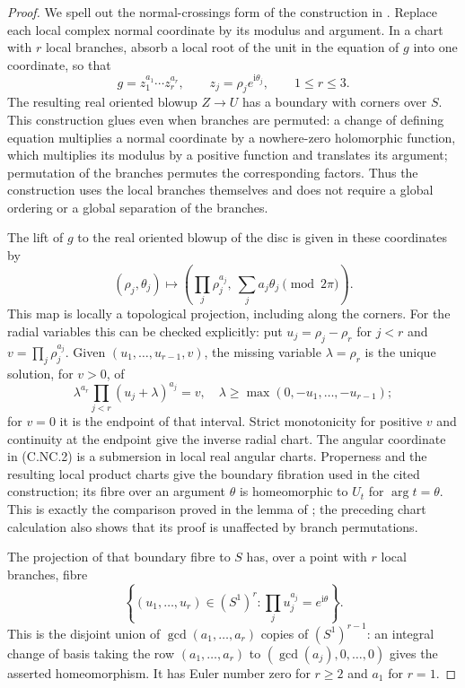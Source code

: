 \begin{proof}
We spell out the normal-crossings form of the construction in \cite[\S2.1--2.2, pp.~237--241]{ACampo1975}. Replace each local complex normal coordinate by its modulus and argument. In a chart with $r$ local branches, absorb a local root of the unit in the equation of $g$ into one coordinate, so that
\[
 g=z_1^{a_1}\cdots z_r^{a_r},\qquad
 z_j=\rho_j e^{\mathrm i\theta_j},\qquad 1\le r\le3.
\]
The resulting real oriented blowup $Z\to U$ has a boundary with corners over $S$. This construction glues even when branches are permuted: a change of defining equation multiplies a normal coordinate by a nowhere-zero holomorphic function, which multiplies its modulus by a positive function and translates its argument; permutation of the branches permutes the corresponding factors. Thus the construction uses the local branches themselves and does not require a global ordering or a global separation of the branches.

The lift of $g$ to the real oriented blowup of the disc is given in these coordinates by
\[
 (\rho_j,\theta_j)\longmapsto
 \left(\prod_j\rho_j^{a_j},\ \sum_j a_j\theta_j\pmod {2\pi}\right).
 \tag{C.NC.2}
\]
This map is locally a topological projection, including along the corners. For the radial variables this can be checked explicitly: put $u_j=\rho_j-\rho_r$ for $j<r$ and $v=\prod_j\rho_j^{a_j}$. Given $(u_1,\ldots,u_{r-1},v)$, the missing variable $\lambda=\rho_r$ is the unique solution, for $v>0$, of
\[
 \lambda^{a_r}\prod_{j<r}(u_j+\lambda)^{a_j}=v,
 \quad \lambda\ge\max(0,-u_1,\ldots,-u_{r-1});
\]
for $v=0$ it is the endpoint of that interval. Strict monotonicity for positive $v$ and continuity at the endpoint give the inverse radial chart. The angular coordinate in (C.NC.2) is a submersion in local real angular charts. Properness and the resulting local product charts give the boundary fibration used in the cited construction; its fibre over an argument $\theta$ is homeomorphic to $U_t$ for $\arg t=\theta$. This is exactly the comparison proved in the lemma of \cite[\S2.2]{ACampo1975}; the preceding chart calculation also shows that its proof is unaffected by branch permutations.

The projection of that boundary fibre to $S$ has, over a point with $r$ local branches, fibre
\[
 \left\{(u_1,\ldots,u_r)\in(S^1)^r:
             \prod_j u_j^{a_j}=e^{\mathrm i\theta}\right\}.
 \tag{C.NC.3}
\]
This is the disjoint union of $\gcd(a_1,\ldots,a_r)$ copies of $(S^1)^{r-1}$: an integral change of basis taking the row $(a_1,\ldots,a_r)$ to $(\gcd(a_j),0,\ldots,0)$ gives the asserted homeomorphism. It has Euler number zero for $r\ge2$ and $a_1$ for $r=1$.


\end{proof}

